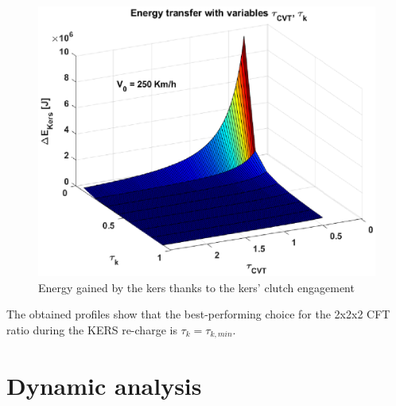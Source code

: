 \documentclass[11pt]{article}
\begin{document}
\begin{figure}[H]
\captionsetup{font=small, justification=centering}
\centering
\includegraphics[width=.7\textwidth]{Images/Results_new/Univariate_SteadyState/en_comp_dec_3D.eps}
\caption{Energy gained by the kers thanks to the kers' clutch engagement}
\label{en_comp_dec_3D}
\end{figure}  

The obtained profiles show that the best-performing choice for the 2x2x2 CFT ratio during the KERS re-charge  is $\tau_k=\tau_{k,min}$.

\section{Dynamic analysis}

\newpage
\end{document}
